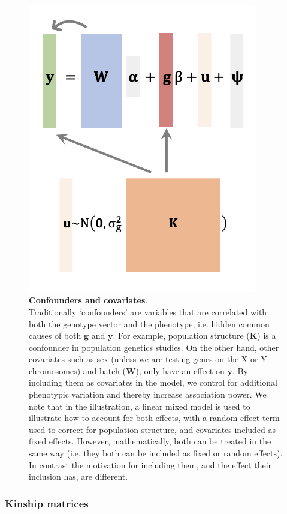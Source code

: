 \begin{figure}[htbp]
\centering
\includegraphics[width=10cm]{Chapter2/Fig/confounders_covariates.png}
\caption[Confounders and covariates]{\textbf{Confounders and covariates}.\\
Traditionally `confounders' are variables that are correlated with both the genotype vector and the phenotype, i.e. hidden common causes of both $\mathbf{g}$ and  $\mathbf{y}$. 
For example, population structure ($\mathbf{K}$) is a confounder in population genetics studies. 
On the other hand, other covariates such as sex (unless we are testing genes on the X or Y chromosomes) and batch ($\mathbf{W}$), only have an effect on $\mathbf{y}$.
By including them as covariates in the model, we control for additional phenotypic variation and thereby increase association power. 
We note that in the illustration, a linear mixed model is used to illustrate how to account for both effects, with a random effect term used to correct for population structure, and covariates included as fixed effects. 
However, mathematically, both can be treated in the same way (i.e. they both can be included as fixed or random effects). 
In contrast the motivation for including them, and the effect their inclusion has, are different.}
\label{fig:conf_cov}
\end{figure}


\subsubsection{Kinship matrices}
\label{sec:kinship_matrices}

